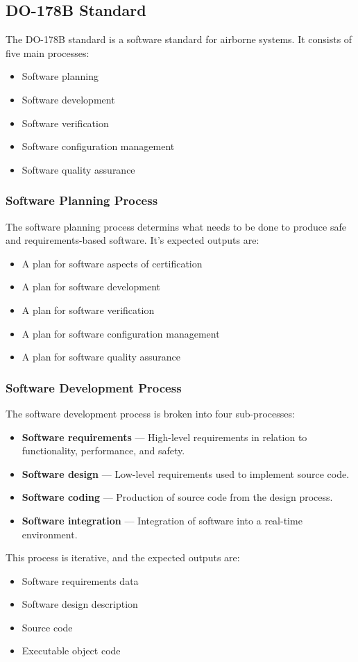 \documentclass{article}
\begin{document}
\subsection{DO-178B Standard}
The DO-178B standard is a software standard for airborne systems. It
consists of five main processes:
\begin{itemize}
    \item Software planning
    \item Software development
    \item Software verification
    \item Software configuration management
    \item Software quality assurance
\end{itemize}
\subsubsection{Software Planning Process}
The software planning process determins what needs to be done to
produce safe and requirements-based software. It's expected outputs
are:
\begin{itemize}
    \item A plan for software aspects of certification
    \item A plan for software development
    \item A plan for software verification
    \item A plan for software configuration management
    \item A plan for software quality assurance
\end{itemize}
\subsubsection{Software Development Process}
The software development process is broken into four sub-processes:
\begin{itemize}
    \item \textbf{Software requirements} --- High-level requirements in
          relation to functionality, performance, and safety.
    \item \textbf{Software design} --- Low-level requirements used
          to implement source code.
    \item \textbf{Software coding} --- Production of source code from
          the design process.
    \item \textbf{Software integration} --- Integration of software
          into a real-time environment.
\end{itemize}
This process is iterative, and the expected outputs are:
\begin{itemize}
    \item Software requirements data
    \item Software design description
    \item Source code
    \item Executable object code
\end{itemize}
\end{document}
